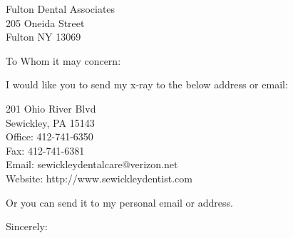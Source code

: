 \documentclass[
    jphafner,
    subject=left, %
    title=centering,
    backaddress=false,
]{scrlttr2}
\date{\today}
\begin{document}
\begin{letter}{%
Fulton Dental Associates \\
205 Oneida Street \\
Fulton NY 13069
}
\setlength\parindent{0pt}

\opening{To Whom it may concern:}

I would like you to send my x-ray to the below address or email:

\vspace{1em}
201 Ohio River Blvd \\
Sewickley, PA 15143 \\

Office: 412-741-6350 \\
Fax: 412-741-6381 \\
Email: sewickleydentalcare@verizon.net \\
Website: http://www.sewickleydentist.com

\vspace{1em}
Or you can send it to my personal email or address.


\closing{Sincerely:}

\end{letter}
\end{document}
